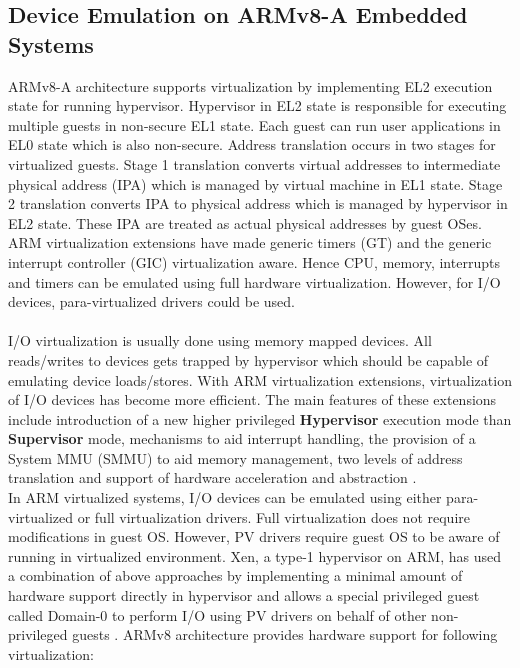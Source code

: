 \subsection{Device Emulation on ARMv8-A Embedded Systems\label{sec:3gpp}}
ARMv8-A architecture supports virtualization by implementing EL2 execution state for running hypervisor. Hypervisor in EL2 state is responsible for executing multiple guests in non-secure EL1 state. Each guest can run user applications in EL0 state which is also non-secure. Address translation occurs in two stages for virtualized guests. Stage 1 translation converts virtual addresses to intermediate physical address (IPA) which is managed by virtual machine in EL1 state. Stage 2 translation converts IPA to physical address which is managed by hypervisor in EL2 state. These IPA are treated as actual physical addresses by guest OSes. ARM virtualization extensions have made generic timers (GT) and the generic interrupt controller (GIC) virtualization aware. Hence CPU, memory, interrupts and timers can be emulated using full hardware virtualization. However, for I/O devices, para-virtualized drivers could be used.\\
\\
I/O virtualization is usually done using memory mapped devices. All reads/writes to devices gets trapped by hypervisor which should be capable of emulating device loads/stores. With ARM virtualization extensions, virtualization of I/O devices has become more efficient. The main features of these extensions include  introduction of a new higher privileged \textbf{Hypervisor} execution mode than \textbf{Supervisor} mode, mechanisms to aid interrupt handling, the provision of a System MMU (SMMU) to aid memory management, two levels of address translation and support of hardware acceleration and abstraction \cite{ARM_VE}.
\\
In ARM virtualized systems, I/O devices can be emulated using either para-virtualized or full virtualization drivers. Full virtualization does not require modifications in guest OS. However, PV drivers require guest OS to be aware of running in virtualized environment. Xen, a type-1 hypervisor on ARM, has used a combination of above approaches by implementing a minimal amount of hardware support directly in hypervisor and allows a special privileged guest called Domain-0 to perform I/O using PV drivers on behalf of other non-privileged guests \cite{dall_li_lim_nieh_koloventzos_2016}. ARMv8 architecture provides hardware support for following virtualization:
